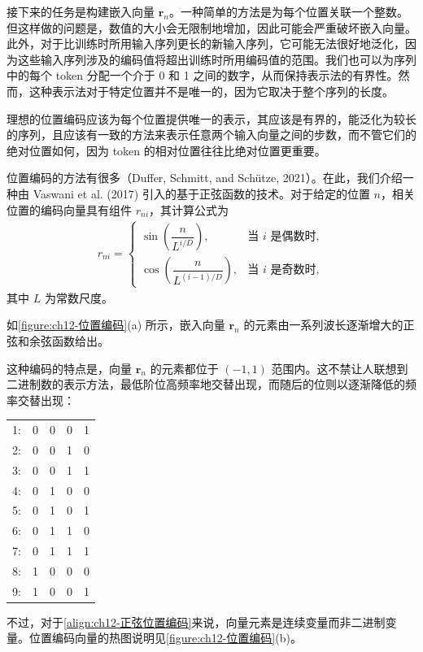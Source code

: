 \documentclass[../../main.tex]{subfiles}
\begin{document}
接下来的任务是构建嵌入向量 $\mathbf{r}_n$。一种简单的方法是为每个位置关联一个整数。但这样做的问题是，数值的大小会无限制地增加，因此可能会严重破坏嵌入向量。此外，对于比训练时所用输入序列更长的新输入序列，它可能无法很好地泛化，因为这些输入序列涉及的编码值将超出训练时所用编码值的范围。我们也可以为序列中的每个 token 分配一个介于 0 和 1 之间的数字，从而保持表示法的有界性。然而，这种表示法对于特定位置并不是唯一的，因为它取决于整个序列的长度。

理想的位置编码应该为每个位置提供唯一的表示，其应该是有界的，能泛化为较长的序列，且应该有一致的方法来表示任意两个输入向量之间的步数，而不管它们的绝对位置如何，因为 token 的相对位置往往比绝对位置更重要。

位置编码的方法有很多（Duffer, Schmitt, and Schütze, 2021）。在此，我们介绍一种由 Vaswani et al. (2017) 引入的基于正弦函数的技术。对于给定的位置 $n$，相关位置的编码向量具有组件 $r_{ni}$，其计算公式为
\begin{align}
r_{ni}=
\begin{cases}
\sin\left(\dfrac{n}{L^{i/D}}\right), & \text{当 }i\text{ 是偶数时},\\[2mm]
\cos\left(\dfrac{n}{L^{(i-1)/D}}\right), & \text{当 }i\text{ 是奇数时},
\end{cases}
\label{align:ch12-正弦位置编码}
\end{align}
其中 $L$ 为常数尺度。

如\cref{figure:ch12-位置编码}(a) 所示，嵌入向量 $\mathbf{r}_n$ 的元素由一系列波长逐渐增大的正弦和余弦函数给出。

这种编码的特点是，向量 $\mathbf{r}_n$ 的元素都位于 $(-1,1)$ 范围内。这不禁让人联想到二进制数的表示方法，最低阶位高频率地交替出现，而随后的位则以逐渐降低的频率交替出现：

\begin{center}
\begin{tabular}{rcccc}
1: & 0 & 0 & 0 & 1\\
2: & 0 & 0 & 1 & 0\\
3: & 0 & 0 & 1 & 1\\
4: & 0 & 1 & 0 & 0\\
5: & 0 & 1 & 0 & 1\\
6: & 0 & 1 & 1 & 0\\
7: & 0 & 1 & 1 & 1\\
8: & 1 & 0 & 0 & 0\\
9: & 1 & 0 & 0 & 1
\end{tabular}
\end{center}

不过，对于\eqref{align:ch12-正弦位置编码}来说，向量元素是连续变量而非二进制变量。位置编码向量的热图说明见\cref{figure:ch12-位置编码}(b)。
\end{document}

